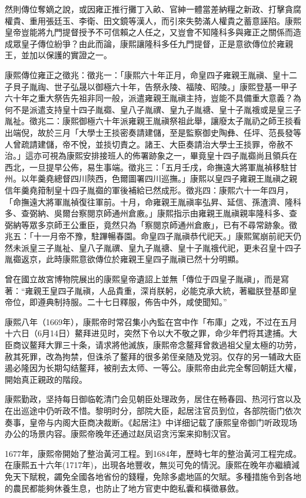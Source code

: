 然則傳位奪嫡之說，或因雍正推行攤丁入畝、官紳一體當差納糧之新政、打擊貪腐權貴、重用張廷玉、李衛、田文鏡等漢人，而引來失勢滿人權貴之蓄意誣陷。康熙皇帝豈能將九門提督授予不可信賴之人任之，又豈會不知隆科多與雍正之關係而造成眾皇子傳位紛爭？由此而論，康熙讓隆科多任九門提督，正是意欲傳位於雍親王，並加以保護的實證之一。

康熙傳位雍正之徵兆：徵兆一：「康熙六十年正月，命皇四子雍親王胤禛、皇十二子貝子胤祹、世子弘晟以御極六十年，告祭永陵、福陵、昭陵。」康熙登基一甲子六十年之重大祭告先祖非同一般，派遣雍親王胤禛主持，豈能不具備重大意義？為何不是派遣支持皇十四子胤禵、皇八子胤禩、皇九子胤禟、皇十子胤䄉或是皇三子胤祉。徵兆二：康熙御極六十年派雍親王胤禛祭祖此舉，讓廢太子胤礽之師王掞看出端倪，故於三月「大學士王掞密奏請建儲，至是監察御史陶彝、任坪、范長發等人曾疏請建儲，帝不悅，並掞切責之。諸王、大臣奏請治大學士王掞罪，帝赦不治。」這亦可視為康熙安排接班人的佈署跡象之一，畢竟皇十四子胤禵尚且領兵在西北，一旦提早公佈，易生事端。徵兆三：「五月壬戌，命撫遠大將軍胤禎移駐甘州。以年羹堯總督四川陝西，色爾圖署四川巡撫。」康熙以皇四子雍親王胤禛之親信年羹堯箝制皇十四子胤禵的軍後補給已然成形。徵兆四：康熙六十一年四月，「命撫遠大將軍胤禎復往軍前。十月，命雍親王胤禛率弘昇、延信、孫渣濟、隆科多、查弼納、吳爾台察閱京師通州倉廒。」康熙指示由雍親王胤禛親率隆科多、查弼納等眾多京師王公重臣，竟然只為「察閱京師通州倉廒」，已有不尋常跡象。徵兆五：「十一月帝不豫，駐蹕暢春園。命皇四子胤禛恭代祀天。」康熙駕崩前祀天仍然未派皇三子胤祉、皇八子胤禩、皇九子胤禟、皇十子胤䄉代祀，更未召皇十四子胤禵返京，此時康熙意欲傳位於雍親王皇四子胤禛已然十分明顯。

曾在國立故宮博物院展出的康熙皇帝遺詔上並無「傳位于四皇子胤禛」，而是寫著：“雍親王皇四子胤禛，人品貴重，深肖朕躬，必能克承大統，著繼朕登基即皇帝位，即遵典制持服。二十七日釋服，佈告中外，咸使聞知。”

康熙八年（1669年），康熙帝时常召集小內監在宫中作「布庫」之戏，不过在五月十六日（6月14日）鰲拜进见时，突然下令以大不敬之罪，命少年們将其逮捕。大臣商议鳌拜大罪三十条，请求將他滅族，康熙帝念鳌拜曾救過祖父皇太極的功劳，赦其死罪，改為拘禁，但诛杀了鳌拜的很多弟侄亲随及党羽。仅存的另一辅政大臣遏必隆因为长期勾结鳌拜，被削去太师、一等公。康熙帝由此完全奪回朝廷大權，開始真正親政的階段。

康熙勤政，坚持每日御临乾清门会见朝臣处理政务，居住在畅春园、热河行宫以及在出巡途中仍听政不惜。黎明时分，部院大臣，起居注官员到位，各部院衙门依次奏事，皇帝与内阁大臣商决裁断。《起居注》中详细记载了康熙皇帝御门听政现场办公的场景内容。康熙帝晚年还通过赵凤诏贪污案来抑制汉官。

1677年，康熙帝開始了整治黃河工程。到1684年，歷時七年的整治黃河工程完成。在康熙五十六年(1717年)，出現各地豐收，無災可免的情況。康熙在晚年亦繼續減免天下賦稅，蠲免全國各地省份的錢糧，免除多處地區的欠賦。多種措施令到各地的農民都能夠休養生息，也防止了地方官吏中飽私囊和橫徵暴斂。

